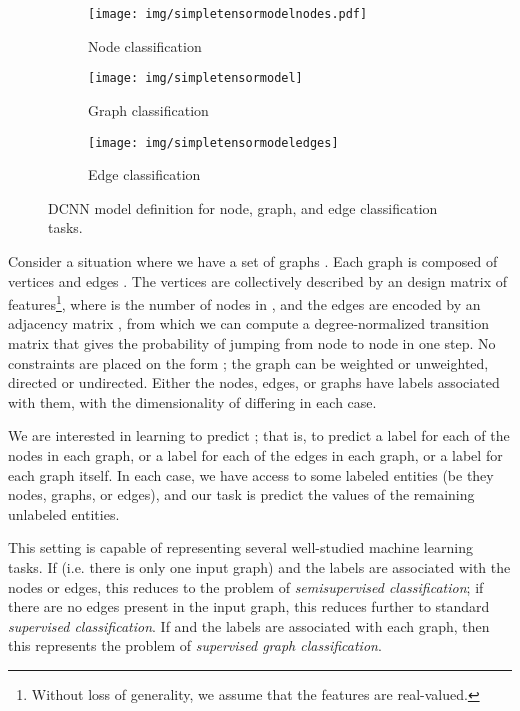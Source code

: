 \documentclass{article}
\begin{document}
\begin{figure}[t]
    \centering
    \begin{subfigure}[t]{0.3\textwidth}
        \centering
        \texttt{[image: img/simpletensormodelnodes.pdf]}
        \caption{Node classification}
        \label{fig:tensormodelnode}
    \end{subfigure}
    \begin{subfigure}[t]{0.3\textwidth}
        \centering
        \texttt{[image: img/simpletensormodel]}
        \caption{Graph classification}
        \label{fig:tensormodelgraph}
    \end{subfigure}
    \begin{subfigure}[t]{0.3\textwidth}
        \centering
        \texttt{[image: img/simpletensormodeledges]}
        \caption{Edge classification}
        \label{fig:tensormodeledges}
    \end{subfigure}
    \caption{DCNN model definition for node, graph, and edge classification tasks.}
    \label{fig:tensormodel}
\end{figure}

Consider a situation where we have a set of  graphs . Each graph  is composed of vertices  and edges .  The vertices are collectively described by an  design matrix  of features\footnote{Without loss of generality, we assume that the features are real-valued.}, where  is the number of nodes in , and the edges  are encoded by an  adjacency matrix , from which we can compute a degree-normalized transition matrix  that gives the probability of jumping from node  to node  in one step.  No constraints are placed on the form ; the graph can be weighted or unweighted, directed or undirected.   Either the nodes, edges, or graphs have labels  associated with them, with the dimensionality of  differing in each case.

We are interested in learning to predict ; that is, to predict a label for each of the nodes in each graph, or a label for each of the edges in each graph, or a label for each graph itself.  In each case, we have access to some labeled entities (be they nodes, graphs, or edges), and our task is predict the values of the remaining unlabeled entities.

This setting is capable of representing several well-studied machine learning tasks.  If  (i.e. there is only one input graph) and the labels  are associated with the nodes or edges, this reduces to the problem of \emph{semisupervised classification}; if there are no edges present in the input graph, this reduces further to standard \emph{supervised classification}.  If  and the labels  are associated with each graph, then this represents the problem of \emph{supervised graph classification}.
\end{document}
